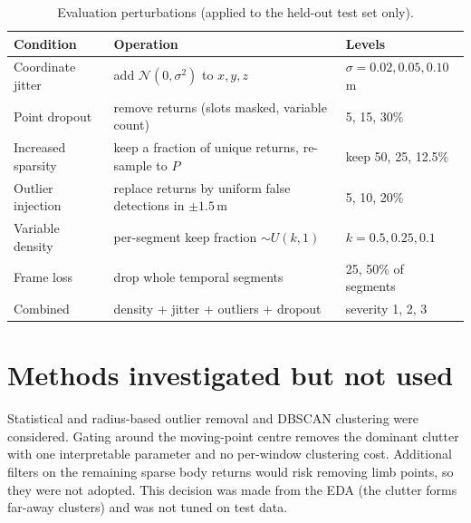 \begin{table}[h]
\centering
\caption{Evaluation perturbations (applied to the held-out test set only).}
\label{tab:noisecond}
\small
\begin{tabular}{L{2.6cm}L{6.2cm}L{4.6cm}}
\toprule
Condition & Operation & Levels \\
\midrule
Coordinate jitter & add $\mathcal{N}(0,\sigma^2)$ to $x,y,z$ & $\sigma=0.02, 0.05, 0.10$\,m \\
Point dropout & remove returns (slots masked, variable count) & 5, 15, 30\% \\
Increased sparsity & keep a fraction of unique returns, re-sample to $P$ & keep 50, 25, 12.5\% \\
Outlier injection & replace returns by uniform false detections in $\pm1.5$\,m & 5, 10, 20\% \\
Variable density & per-segment keep fraction $\sim U(k,1)$ & $k=0.5, 0.25, 0.1$ \\
Frame loss & drop whole temporal segments & 25, 50\% of segments \\
Combined & density + jitter + outliers + dropout & severity 1, 2, 3 \\
\bottomrule
\end{tabular}
\end{table}

\section{Methods investigated but not used}
Statistical and radius-based outlier removal and DBSCAN clustering were
considered. Gating around the moving-point centre removes the dominant clutter
with one interpretable parameter and no per-window clustering cost. Additional
filters on the remaining sparse body returns would risk removing limb points, so
they were not adopted. This decision was made from the EDA (the clutter forms
far-away clusters) and was not tuned on test data.
